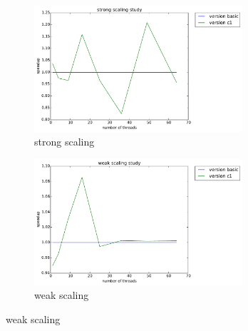 \documentclass[12pt]{article}
\numberwithin{equation}{section}
\begin{document}
\begin{figure}[!ht]
   \begin{subfigure}
      \centering
        \begin{center}
      \includegraphics[width=0.85\textwidth] {plots/c_strong_ivdep}
        \end{center}
      \label{aload0}
      \caption{strong scaling}
  \end{subfigure}
  \begin{subfigure}
      \centering
        \begin{center}
      \includegraphics[width=0.85\textwidth] {plots/c_weak_ivdep}
        \end{center}
      \label{aload1}
      \caption{weak scaling}
  \end{subfigure}
\end{figure}
\end{document}
